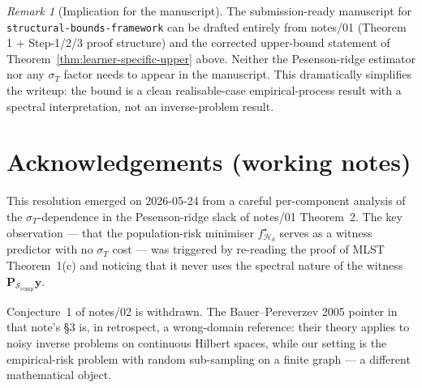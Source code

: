 \documentclass[11pt,a4paper]{article}
\theoremstyle{plain}
\theoremstyle{definition}
\theoremstyle{remark}
\newtheorem{remark}[theorem]{Remark}
\newcommand{\by}{\mathbf{y}}
\newcommand{\bP}{\mathbf{P}}
\newcommand{\Scal}{\mathcal{S}}
\newcommand{\Hcal}{\mathcal{H}}
\begin{document}
\begin{remark}[Implication for the manuscript]
\label{rem:manuscript-implication}
The submission-ready manuscript for
\texttt{structural-bounds-framework} can be drafted entirely from
notes/01 (Theorem 1 + Step-1/2/3 proof structure) and the corrected
upper-bound statement of Theorem~\ref{thm:learner-specific-upper} above.
Neither the Pesenson-ridge estimator nor any $\sigma_T$ factor needs
to appear in the manuscript.  This dramatically simplifies the writeup:
the bound is a clean realisable-case empirical-process result with a
spectral interpretation, not an inverse-problem result.
\end{remark}

\section*{Acknowledgements (working notes)}

This resolution emerged on 2026-05-24 from a careful per-component
analysis of the $\sigma_T$-dependence in the Pesenson-ridge slack
of notes/01 Theorem~2.  The key observation — that the
population-risk minimiser $f^\star_{\Hcal_d}$ serves as a witness
predictor with no $\sigma_T$ cost — was triggered by re-reading
the proof of MLST Theorem~1(c) and noticing that it never uses
the spectral nature of the witness $\bP_{\Scal_{\mathrm{comp}}}\by$.

Conjecture~1 of notes/02 is withdrawn.  The Bauer--Pereverzev 2005
pointer in that note's §3 is, in retrospect, a wrong-domain reference:
their theory applies to noisy inverse problems on continuous Hilbert
spaces, while our setting is the empirical-risk problem with random
sub-sampling on a finite graph — a different mathematical object.
\end{document}
